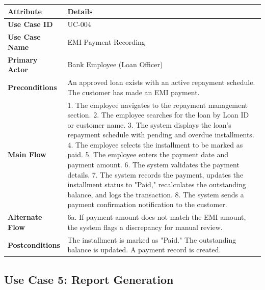 \documentclass[12pt,a4paper,oneside]{report}
\begin{document}
\begin{table}[htbp]
\centering
\small
\begin{tabularx}{\textwidth}{l l}
\toprule
\textbf{Attribute} & \textbf{Details} \\
\midrule
\textbf{Use Case ID} & UC-004 \\
\textbf{Use Case Name} & EMI Payment Recording \\
\textbf{Primary Actor} & Bank Employee (Loan Officer) \\
\textbf{Preconditions} & An approved loan exists with an active repayment schedule. The customer has made an EMI payment. \\
\textbf{Main Flow} & 1. The employee navigates to the repayment management section. 2. The employee searches for the loan by Loan ID or customer name. 3. The system displays the loan's repayment schedule with pending and overdue installments. 4. The employee selects the installment to be marked as paid. 5. The employee enters the payment date and payment amount. 6. The system validates the payment details. 7. The system records the payment, updates the installment status to "Paid," recalculates the outstanding balance, and logs the transaction. 8. The system sends a payment confirmation notification to the customer. \\
\textbf{Alternate Flow} & 6a. If payment amount does not match the EMI amount, the system flags a discrepancy for manual review. \\
\textbf{Postconditions} & The installment is marked as "Paid." The outstanding balance is updated. A payment record is created. \\
\bottomrule
\end{tabularx}
\end{table}

\subsection{Use Case 5: Report Generation}
\end{document}
